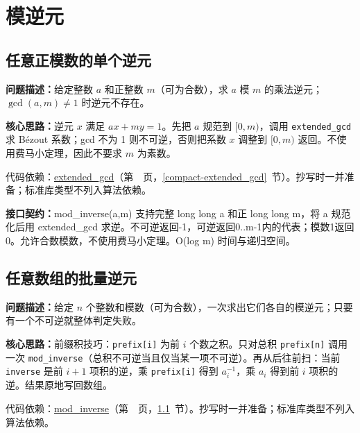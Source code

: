 \Needspace{314pt}

\section{模逆元}

\subsection{任意正模数的单个逆元}\label{compact-mod_inverse}

\noindent\textbf{问题描述：}\allowbreak 给定整数 $a$ 和正整数 $m$（可为合数），求 $a$ 模 $m$ 的乘法逆元；$\gcd(a,m)\ne1$ 时逆元不存在。

\textbf{核心思路：}\allowbreak 逆元 $x$ 满足 $ax+my=1$。先把 $a$ 规范到 $[0,m)$，调用 \texttt{extended\_gcd} 求 Bézout 系数；gcd 不为 1 则不可逆，否则把系数 $x$ 调整到 $[0,m)$ 返回。不使用费马小定理，因此不要求 $m$ 为素数。

代码依赖：\hyperref[compact-extended_gcd]{extended\_\allowbreak{}gcd}（第~\pageref{compact-extended_gcd}~页，\ref{compact-extended_gcd}~节）。抄写时一并准备；标准库类型不列入算法依赖。

{\sloppy{}\noindent\textbf{接口契约：}mod\_inverse(a,m) 支持完整 long long a 和正 long long m，将 a 规范化后用 extended\_gcd 求逆。不可逆返回-1，可逆返回0..m-1内的代表；模数1返回0。允许合数模数，不使用费马小定理。O(log m) 时间与递归空间。\par}



\Needspace{428pt}

\subsection{任意数组的批量逆元}\label{compact-batch_inverse}

\noindent\textbf{问题描述：}\allowbreak 给定 $n$ 个整数和模数（可为合数），一次求出它们各自的模逆元；只要有一个不可逆就整体判定失败。

\textbf{核心思路：}\allowbreak 前缀积技巧：\texttt{prefix[i]} 为前 $i$ 个数之积。只对总积 \texttt{prefix[n]} 调用一次 \texttt{mod\_inverse}（总积不可逆当且仅当某一项不可逆）。再从后往前扫：当前 \texttt{inverse} 是前 $i+1$ 项积的逆，乘 \texttt{prefix[i]} 得到 $a_i^{-1}$，乘 $a_i$ 得到前 $i$ 项积的逆。结果原地写回数组。

代码依赖：\hyperref[compact-mod_inverse]{mod\_\allowbreak{}inverse}（第~\pageref{compact-mod_inverse}~页，\ref{compact-mod_inverse}~节）。抄写时一并准备；标准库类型不列入算法依赖。

